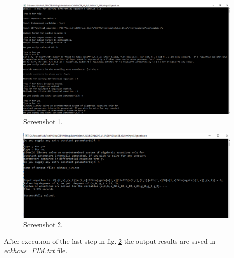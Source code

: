 \documentclass[11pt,a4paper,titlepage]{article}
\begin{document}
\begin{figure}[H]
	\centering
	\includegraphics[width=\linewidth]{gtools_ss1}
	\caption{ Screenshot 1. }
	\label{fig:gtools_ss1}
\end{figure}

\begin{figure}[H]
	\centering
	\includegraphics[width=\linewidth]{gtools_ss2}
	\caption{ Screenshot 2. }
	\label{fig:gtools_ss2}
\end{figure}


After execution of the last step in fig. \ref{fig:gtools_ss2} the output results are saved in \emph{eckhaus\_FIM.txt} file.
\end{document}
